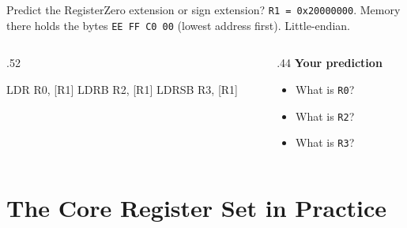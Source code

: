 \documentclass[9pt,aspectratio=169,xcolor=table]{beamer}
\begin{document}
{\beamerextras
\begin{frame}[fragile]{Predict the Register}{Zero extension or sign extension?}
    \leavevmode
    \texttt{R1 = 0x20000000}. Memory there holds the bytes \texttt{EE FF C0 00} (lowest address first). Little-endian.

    \vspace{2mm}
    \begin{columns}[T]
    \begin{column}{.52\textwidth}
\begin{asm}[basicstyle=\ttfamily\small]
LDR   R0, [R1]
LDRB  R2, [R1]
LDRSB R3, [R1]
\end{asm}
    \end{column}
    \begin{column}{.44\textwidth}
        \textbf{Your prediction}
        {\small
        \begin{itemize}\itemsep2pt
            \item What is \texttt{R0}?
            \item What is \texttt{R2}?
            \item What is \texttt{R3}?
        \end{itemize}}
    \end{column}
    \end{columns}

    \vspace{2mm}
\end{frame}
}


\section{The Core Register Set in Practice}
\end{document}
